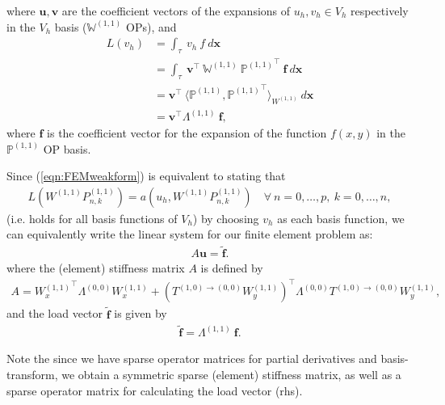 \documentclass[11pt, oneside]{article}   	%
\newcommand{\Wii}{W^{(1,1)}}
\newcommand{\Pii}{P^{(1,1)}}
\newcommand{\bigPii}{{\mathbb{P}^{(1,1)}}}
\newcommand{\element}{\tau}
\newcommand{\bigWii}{{\mathbb{W}^{(1,1)}}}
\begin{document}
where $\mathbf{u}, \mathbf{v}$ are the coefficient vectors of the expansions of $u_h, v_h \in V_h$ respectively in the $V_h$ basis ($\bigWii$ OPs), and
\begin{align}
	L(v_h) &= \int_\element \: v_h \: f \: d\mathbf{x} \\
	&= \int_\element \: \mathbf{v}^\top \: \bigWii \: \bigPii^\top \: \mathbf{f} \: d\mathbf{x} \\
	&= \mathbf{v}^\top \: \langle \bigPii, {\bigPii}^\top \rangle_{\Wii} \: d\mathbf{x} \\
	&= \mathbf{v}^\top \Lambda^{(1,1)} \: \mathbf{f},
\end{align}
where $\mathbf{f}$ is the coefficient vector for the expansion of the function $f(x,y)$ in the $\bigPii$ OP basis.

Since (\ref{eqn:FEMweakform}) is equivalent to stating that
\begin{align}
	L(\Wii \Pii_{n,k}) = a(u_h,\Wii \Pii_{n,k}) \quad \forall \: n = 0,\dots,p, \: k = 0,\dots,n,
\end{align}
(i.e. holds for all basis functions of $V_h$) by choosing $v_h$ as each basis function, we can equivalently write the linear system for our finite element problem as:
\begin{align}
A\mathbf{u} = \tilde{\mathbf{f}}.
\end{align}
where the (element) stiffness matrix $A$ is defined by 
\begin{align}
A = {\Wii_x}^\top \Lambda^{(0,0)} \Wii_x + ({T^{(1,0)\to(0,0)} \Wii_y})^\top \Lambda^{(0,0)} T^{(1,0)\to(0,0)} \Wii_y, 
\end{align}
and the load vector $\tilde{\mathbf{f}}$ is given by 
\begin{align}
\tilde{\mathbf{f}} = \Lambda^{(1,1)} \: \mathbf{f}.
\end{align}

Note the since we have sparse operator matrices for partial derivatives and basis-transform, we obtain a symmetric sparse (element) stiffness matrix, as well as a sparse operator matrix for calculating the load vector (rhs).
\end{document}
